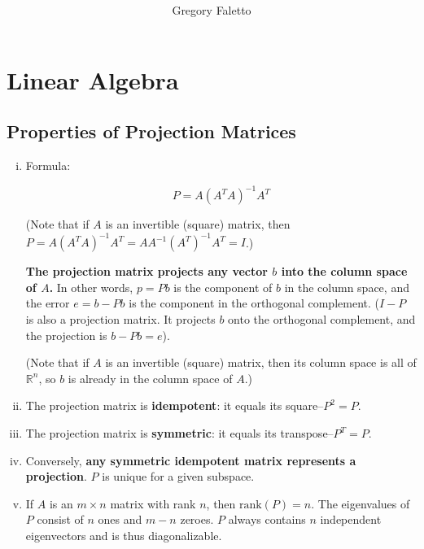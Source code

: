 \documentclass{article}
\title{
    \vspace{2in}
    \textmd{\textbf{ \hmwkTitle}}\\
}
\author{Gregory Faletto}
\date{}
\begin{document}
\maketitle

\pagebreak

\tableofcontents

\newpage

\section{Linear Algebra}
\subsection{Properties of Projection Matrices}

\begin{enumerate}[i.]

\item Formula:

\[
P = A(A^TA)^{-1}A^T
\]

(Note that if \(A\) is an invertible (square) matrix, then \(P = A(A^TA)^{-1}A^T = AA^{-1}(A^T)^{-1}A^T = I\).)

\textbf{The projection matrix projects any vector \(b\) into the column space of \(A\).} In other words, \(p = Pb\) is the component of \(b\) in the column space, and the error \(e = b - Pb\) is the component in the orthogonal complement. (\(I - P\) is also a projection matrix. It projects \(b\) onto the orthogonal complement, and the projection is \(b - Pb = e\)).

(Note that if \(A\) is an invertible (square) matrix, then its column space is all of \(\mathbb{R}^n\), so \(b\) is already in the column space of \(A\).)

\item The projection matrix is \textbf{idempotent}: it equals its square--\(P^2 = P\).

\item The projection matrix is \textbf{symmetric}: it equals its transpose--\(P^T = P\).

\item Conversely, \textbf{any symmetric idempotent matrix represents a projection}. \(P\) is unique for a given subspace.

\item If \(A\) is an \(m \times n\) matrix with rank \(n\), then \(\text{rank} (P) = n\). The eigenvalues of \(P\) consist of \(n\) ones and \(m - n\) zeroes. \(P\) always contains \(n\) independent eigenvectors and is thus diagonalizable. 

\end{enumerate}
\end{document}

